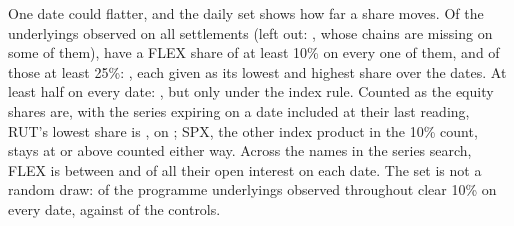 \documentclass[11pt]{article}
\begin{document}
One date could flatter, and the daily set shows how far a share moves. Of the
\HiddenDailyComplete{} underlyings observed on all \HiddenDailyDates{} settlements (left
out: \HiddenDailyIncompleteNames{}, whose chains are missing on some of them),
\HiddenStableTen{} have a FLEX share of at least 10\% on every one of them, and
\HiddenStableQuarter{} of those at least 25\%: \HiddenQuarterRanges{}, each given as its
lowest and highest share over the dates. At least half on every date:
\HiddenStableHalfNames{}, but only under the index rule. Counted as the equity shares
are, with the series expiring on a date included at their last reading, RUT's lowest
share is \HiddenRutFullLow{}, on \HiddenRutFullLowDate{}; SPX, the other index product
in the 10\% count, stays at or above \HiddenSpxEitherLow{} counted either way. Across
the \HiddenDailySearch{} names in the series search,
FLEX is between \HiddenDailyAggregateLow{} and \HiddenDailyAggregateHigh{} of all their
open interest on each date. The set is not a random draw:
\HiddenStableTenProgramme{} of the \HiddenCompleteProgramme{} programme underlyings
observed throughout clear 10\% on every date, against \HiddenStableTenControl{} of the
\HiddenCompleteControl{} controls.
\end{document}
